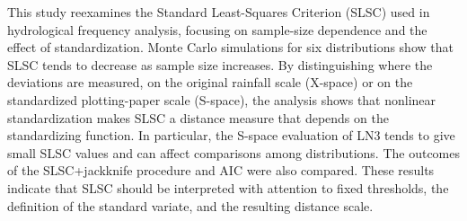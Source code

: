 This study reexamines the Standard Least-Squares Criterion (SLSC) used in hydrological frequency analysis, focusing on sample-size dependence and the effect of standardization. Monte Carlo simulations for six distributions show that SLSC tends to decrease as sample size increases. By distinguishing where the deviations are measured, on the original rainfall scale (X-space) or on the standardized plotting-paper scale (S-space), the analysis shows that nonlinear standardization makes SLSC a distance measure that depends on the standardizing function. In particular, the S-space evaluation of LN3 tends to give small SLSC values and can affect comparisons among distributions. The outcomes of the SLSC+jackknife procedure and AIC were also compared. These results indicate that SLSC should be interpreted with attention to fixed thresholds, the definition of the standard variate, and the resulting distance scale.
